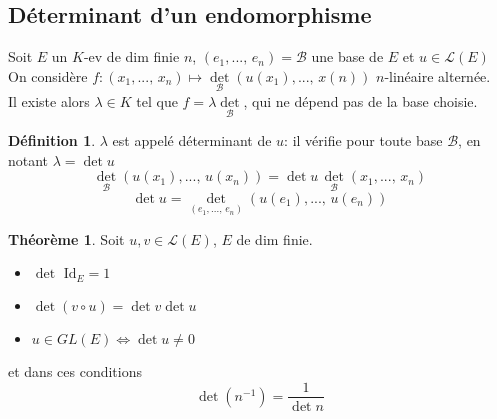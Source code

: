 \documentclass[10pt,a4paper]{article}
\theoremstyle{definition}
\newtheorem{theorem}[proposition]{Théorème}
\newtheorem{definition}[proposition]{Définition}
\begin{document}
\subsection{Déterminant d'un endomorphisme}
\noindent Soit $E$ un $K$-ev de dim finie $n$, $(e_1, ...,\, e_n) = \mathcal{B}$ une base de $E$ et $u \in \mathcal{L}(E)$ \\
On considère $f: (x_1, ...,\, x_n) \mapsto \underset{\mathcal{B}}\det(u(x_1), ...,\, x(n))$ $n$-linéaire alternée. \\
Il existe alors $\lambda \in K$ tel que $f = \lambda \underset{\mathcal{B}}\det$, qui ne dépend pas de la base choisie.
\begin{definition}
$\lambda$ est appelé déterminant de $u$: il vérifie pour toute base $\mathcal{B}$, en notant $\lambda = \det u$
\[  \underset{\mathcal{B}}\det(u(x_1), ...,\, u(x_n)) = \det u \, \underset{\mathcal{B}}\det(x_1, ...,\, x_n) \]
\[ \det u = \underset{(e_1, ...,\, e_n)}\det(u(e_1), ...,\, u(e_n)) \]
\end{definition}

\pagebreak

\begin{theorem}
Soit $u, v \in \mathcal{L}(E)$, $E$ de dim finie.
\begin{itemize}
\item $\det \text{ Id}_E = 1$
\item $\det(v \circ u) = \det v \det u$
\item $u \in GL(E) \iff \det u \neq 0$
\end{itemize}
et dans ces conditions
\[ \det(n^{-1}) = \frac{1}{\det n} \]
\end{theorem}
\end{document}
